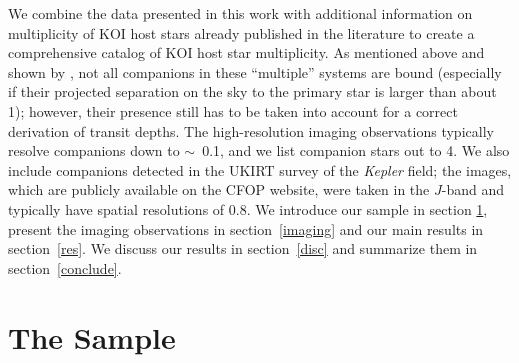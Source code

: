 \documentclass[twocolumn,appendixfloats]{aastex6}
\begin{document}
We combine the data presented in this work with additional information on multiplicity 
of KOI host stars already published in the literature to create a comprehensive catalog 
of KOI host star multiplicity. As mentioned above and shown by \citet{horch14}, not 
all companions in these ``multiple'' systems are bound (especially if their projected 
separation on the sky to the primary star is larger than about 1\arcsec); however, 
their presence still has to be taken into account for a correct derivation of transit 
depths. The high-resolution imaging observations typically resolve companions 
down to $\sim$~0.1\arcsec, and we list companion stars out to 4\arcsec. We also 
include companions detected in the UKIRT survey of the {\it Kepler} field; the images, 
which are publicly available on the CFOP website, were taken in the $J$-band 
and typically have spatial resolutions of 0.8\arcsec. 
We introduce our sample in section \ref{sample}, present the imaging observations 
in section~\ref{imaging} and our main results in section~\ref{res}. We discuss our 
results in section~\ref{disc} and summarize them in section~\ref{conclude}.


\section{The Sample}
\label{sample}
\end{document}
